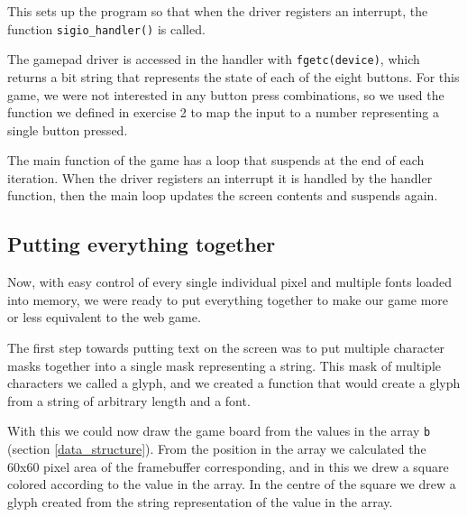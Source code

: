 

This sets up the program so that when the driver registers an interrupt, the function \texttt{sigio\_handler()} is called.


The gamepad driver is accessed in the handler with \texttt{fgetc(device)}, which returns a bit string that represents the state of each of the eight buttons.
For this game, we were not interested in any button press combinations, so we used the function we defined in exercise 2 to map the input to a number representing a single button pressed.



The main function of the game has a loop that suspends at the end of each iteration.
When the driver registers an interrupt it is handled by the handler function, then the main loop updates the screen contents and suspends again.

\newpage


\newpage


\subsection{Putting everything together}
Now, with easy control of every single individual pixel and multiple fonts loaded into memory, we were ready to put everything together to make our game more or less equivalent to the web game.

The first step towards putting text on the screen was to put multiple character masks together into a single mask representing a string.
This mask of multiple characters we called a glyph, and we created a function that would create a glyph from a string of arbitrary length and a font.



With this we could now draw the game board from the values in the array \texttt{b} (section \ref{data_structure}).
From the position in the array we calculated the 60x60 pixel area of the framebuffer corresponding, and in this we drew a square colored according to the value in the array.
In the centre of the square we drew a glyph created from the string representation of the value in the array.


